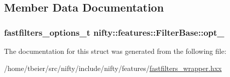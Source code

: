 \subsection{Member Data Documentation}
\hypertarget{structnifty_1_1features_1_1FilterBase_a4bd3a5f88a4c061e80f0b0c4a1074c8c}{}
\subsubsection[{opt\+\_\+}]{\setlength{\rightskip}{0pt plus 5cm}fastfilters\+\_\+options\+\_\+t nifty\+::features\+::\+Filter\+Base\+::opt\+\_\+\hspace{0.3cm}{\ttfamily [protected]}}\label{structnifty_1_1features_1_1FilterBase_a4bd3a5f88a4c061e80f0b0c4a1074c8c}


The documentation for this struct was generated from the following file\+:\begin{DoxyCompactItemize}
\item 
/home/tbeier/src/nifty/include/nifty/features/\hyperlink{fastfilters__wrapper_8hxx}{fastfilters\+\_\+wrapper.\+hxx}\end{DoxyCompactItemize}
